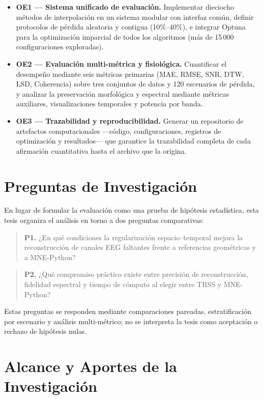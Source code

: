 \begin{itemize}
  \item \textbf{OE1 — Sistema unificado de evaluación.} Implementar dieciocho métodos de interpolación en un sistema modular con interfaz común, definir protocolos de pérdida aleatoria y contigua (10\%--40\%), e integrar Optuna para la optimización imparcial de todos los algoritmos (más de 15\,000 configuraciones exploradas).

  \item \textbf{OE2 — Evaluación multi-métrica y fisiológica.} Cuantificar el desempeño mediante seis métricas primarias (MAE, RMSE, SNR, DTW, LSD, Coherencia) sobre tres conjuntos de datos y 120 escenarios de pérdida, y analizar la preservación morfológica y espectral mediante métricas auxiliares, visualizaciones temporales y potencia por banda.

  \item \textbf{OE3 — Trazabilidad y reproducibilidad.} Generar un repositorio de artefactos computacionales —código, configuraciones, registros de optimización y resultados— que garantice la trazabilidad completa de cada afirmación cuantitativa hasta el archivo que la origina.
\end{itemize}

\section{Preguntas de Investigación}

En lugar de formular la evaluación como una prueba de hipótesis estadística, esta tesis organiza el análisis en torno a dos preguntas comparativas:

\begin{quote}
\textbf{P1.} ¿En qué condiciones la regularización espacio--temporal mejora la reconstrucción de canales EEG faltantes frente a referencias geométricas y a MNE-Python?
\end{quote}

\begin{quote}
\textbf{P2.} ¿Qué compromiso práctico existe entre precisión de reconstrucción, fidelidad espectral y tiempo de cómputo al elegir entre TRSS y MNE-Python?
\end{quote}

Estas preguntas se responden mediante comparaciones pareadas, estratificación por escenario y análisis multi-métrico; no se interpreta la tesis como aceptación o rechazo de hipótesis nulas.
\section{Alcance y Aportes de la Investigación}

